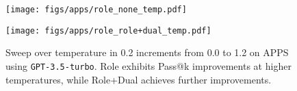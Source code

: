  \begin{figure}[ht]
\vspace{-0.5cm}
    \centering

    \begin{minipage}{0.40\textwidth}
        \texttt{[image: figs/apps/role\_none\_temp.pdf]}
        \label{fig:role_none_temp}
    \end{minipage}
    \hfill
    \begin{minipage}{0.40\textwidth}
        \texttt{[image: figs/apps/role\_role+dual\_temp.pdf]}
        \label{fig:role_role_dual_temp}
    \end{minipage}
    \vspace{-0.7cm}
    \caption{Sweep over temperature in 0.2 increments from 0.0 to 1.2 on APPS using \texttt{GPT-3.5-turbo}. Role exhibits Pass@k improvements at higher temperatures, while Role+Dual achieves further improvements.   
    }
     \label{fig:apps_role_dual_temp}%
\end{figure}